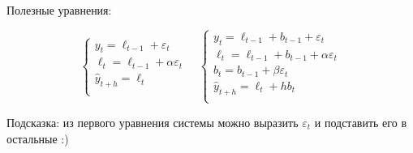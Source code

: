 \documentclass[12pt]{article} %
\begin{document}
Полезные уравнения:

\[
\begin{cases}
y_t = \ell_{t-1} + \varepsilon_t \\
\ell_t = \ell_{t-1} + \alpha \varepsilon_t \\
\hat y_{t+h} = \ell_t \\
\end{cases} \quad
\begin{cases}
y_t = \ell_{t-1} + b_{t-1} + \varepsilon_t \\
\ell_t = \ell_{t-1} + b_{t-1} + \alpha \varepsilon_t \\
b_t = b_{t-1} + \beta \varepsilon_t \\
\hat y_{t+h} = \ell_t + h b_t \\
\end{cases}    
\]

Подсказка: из первого уравнения системы можно выразить $\varepsilon_t$ и подставить его в остальные :)
\end{document}
